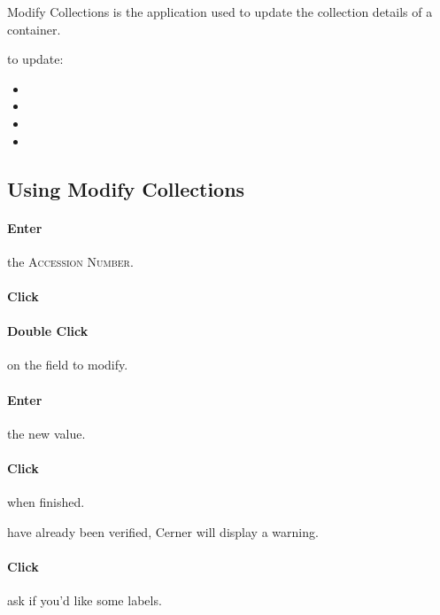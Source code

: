 Modify Collections is the application used to update the collection details of a container.\\



 to update:
\begin{itemize}
    \item {}
    \item {}
    \item {}
    \item {}
\end{itemize}

\subsection{Using Modify Collections}

\paragraph{Enter} the \textsc{Accession Number}.

\paragraph{Click} 

\paragraph{Double Click} on the field to modify.

\paragraph{Enter} the new value.

\paragraph{Click}  when finished.

 have already been verified, Cerner will display a warning.\\


\paragraph{Click} 

 ask if you'd like some labels.\\


